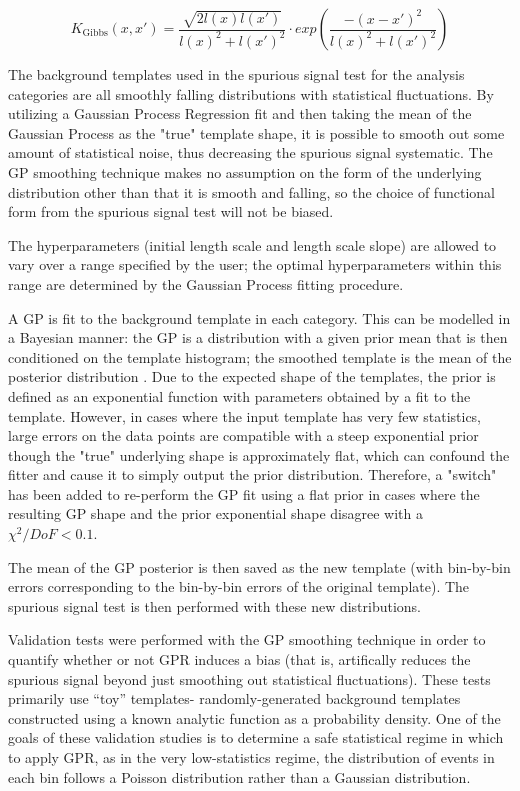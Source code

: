 \begin{equation}
K_\text{Gibbs}(x, x') = \frac{\sqrt{2l(x)l(x')}}{l(x)^2 + l(x')^2 } \cdot exp\left( \frac{-(x-x')^2}{l(x)^2 + l(x')^2} \right)
\end{equation}


The background templates used in the spurious signal test for the analysis categories are all smoothly falling distributions with statistical fluctuations. By utilizing a Gaussian Process Regression fit and then taking the mean of the Gaussian Process as the "true" template shape, it is possible to smooth out some amount of statistical noise, thus decreasing the spurious signal systematic. The GP smoothing technique makes no assumption on the form of the underlying distribution other than that it is smooth and falling, so the choice of functional form from the spurious signal test will not be biased.

The hyperparameters (initial length scale and length scale slope) are allowed to vary over a range specified by the user; the optimal hyperparameters within this range are determined by the Gaussian Process fitting procedure.

A GP is fit to the background template in each category. This can be modelled in a Bayesian manner: the GP is a distribution with a given prior mean that is then conditioned on the template histogram; the smoothed template is the mean of the posterior distribution \cite{3569}. Due to the expected shape of the templates, the prior is defined as an exponential function with parameters obtained by a fit to the template. However, in cases where the input template has very few statistics, large errors on the data points are compatible with a steep exponential prior though the "true" underlying shape is approximately flat, which can confound the fitter and cause it to simply output the prior distribution. Therefore, a "switch" has been added to re-perform the GP fit using a flat prior in cases where the resulting GP shape and the prior exponential shape disagree with a $\chi^2/DoF < 0.1$.

The mean of the GP posterior is then saved as the new template (with bin-by-bin errors corresponding to the bin-by-bin errors of the original template). The spurious signal test is then performed with these new distributions.

Validation tests were performed with the GP smoothing technique in order to quantify whether or not GPR induces a bias (that is, artifically reduces the spurious signal beyond just smoothing out statistical fluctuations). These tests primarily use “toy” templates- randomly-generated background templates constructed using a known analytic function as a probability density. One of the goals of these validation studies is to determine a safe statistical regime in which to apply GPR, as in the very low-statistics regime, the distribution of events in each bin follows a Poisson distribution rather than a Gaussian distribution.

